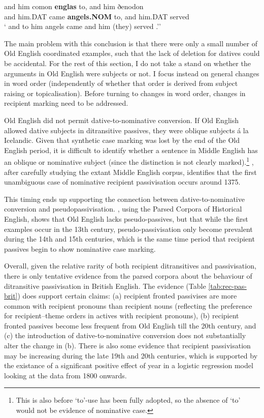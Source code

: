 	\begin{exe}
		\ex \label{ex:OECSD} and him comon \textbf{englas} to, and him ðenodon\\
		and him.DAT came \textbf{angels.NOM} to, and him.DAT served\\
		\trans ` and to him angels came and him (they) served \citep[ex. 34]{Allen.1999}.''
	\end{exe}

	The main problem with this conclusion is that there were only a small number of Old English coordinated examples, such that the lack of deletion for datives could be accidental. For the rest of this section, I do not take a stand on whether the arguments in Old English were subjects or not. I focus instead on general changes in word order (independently of whether that order is derived from subject raising or topicalisation). Before turning to changes in word order, changes in recipient marking need to be addressed.

	Old English did not permit dative-to-nominative conversion. If Old English allowed dative subjects in ditransitive passives, they were oblique subjects \'{a} la Icelandic. Given that synthetic case marking was lost by the end of the Old English period, it is difficult to identify whether a sentence in Middle English has an oblique or nominative subject (since the distinction is not clearly marked).\footnote{This is also before `to'-use has been fully adopted, so the absence of `to' would not be evidence of nominative case.} \cite{Allen.1999}, after carefully studying the extant Middle English corpus, identifies that the first unambiguous case of nominative recipient passivisation occurs around 1375. 

	This timing ends up supporting the connection between dative-to-nominative conversion and pseudopassivisation. \cite{Sigursson.2014}, using the Parsed Corpora of Historical English, shows that Old English lacks pseudo-passives, but that while the first examples occur in the 13th century, pseudo-passivisation only become prevalent during the 14th and 15th centuries, which is the same time period that recipient passives begin to show nominative case marking.

	Overall, given the relative rarity of both recipient ditransitives and passivisation, there is only tentative evidence from the parsed corpora about the behaviour of ditransitive passivisation in British English. The evidence (Table \ref{tab:rec-pas-brit}) does support certain claims: (a) recipient fronted passivises are more common with recipient pronouns than recipient nouns (reflecting the preference for recipient--theme orders in actives with recipient pronouns), (b) recipient fronted passives become less frequent from Old English till the 20th century, and (c) the introduction of dative-to-nominative conversion does not substantially alter the change in (b). There is also some evidence that recipient passivisation may be increasing during the late 19th and 20th centuries, which is supported by the existance of a significant positive effect of year in a logistic regression model looking at the data from 1800 onwards.

